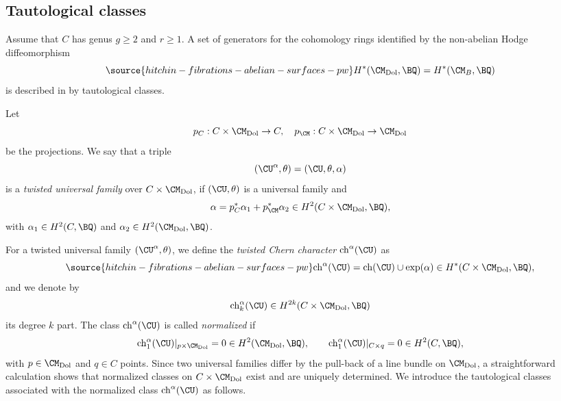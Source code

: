 
\subsection{Tautological classes}\label{sec_0.3}
Assume that $C$ has genus $g \geq 2$ and $r \geq 1$. A set of generators for the  cohomology rings identified by the non-abelian Hodge diffeomorphism
\begin{equation}\label{cohomology}
\source{hitchin-fibrations-abelian-surfaces-pw}
H^\ast(\CM_{\mathrm{Dol}}, \BQ) = H^\ast(\CM_B, \BQ)
\end{equation}
is described in \cite{Markman} by tautological classes.

Let
\[
p_C: C \times \CM_{\mathrm{Dol}} \to C,\quad  p_\CM: C \times \CM_{\mathrm{Dol}} \to  \CM_{\mathrm{Dol}}\]
be the projections. We say that a triple
\[
(\CU^\alpha, \theta) = (\CU, \theta, \alpha)
\]
is a {\em twisted universal family} over $C \times \CM_{\mathrm{Dol}}$, if $(\CU, \theta)$ is a universal family and
\[
\alpha = p_C^\ast \alpha_1 +p_\CM^\ast \alpha_2 \in H^2(C\times \CM_{\mathrm{Dol}}, \BQ),
\]
with $\alpha_1 \in H^2(C, \BQ)$ and $\alpha_2 \in H^2(\CM_{\mathrm{Dol}}, \BQ)$.

For a twisted universal family $(\CU^\alpha, \theta)$, we define the {\em twisted Chern character} $\mathrm{ch}^\alpha(\CU)$ as
\begin{equation*}\label{uni_eqn1}
\source{hitchin-fibrations-abelian-surfaces-pw}
\mathrm{ch}^\alpha(\CU) = \mathrm{ch}(\CU) \cup \mathrm{exp}(\alpha) \in H^*(C\times \CM_{\mathrm{Dol}}, \BQ),
\end{equation*}
and we denote by
\[
\mathrm{ch}_k^\alpha(\CU) \in H^{2k}(C\times \CM_{\mathrm{Dol}},\BQ)
\]
its degree $k$ part. The class $\mathrm{ch}^\alpha(\CU)$ is called \emph{normalized} if
\[
\mathrm{ch}^\alpha_1(\CU)|_{p \times \CM_{\mathrm{Dol}}} =0 \in H^2(\CM_{\mathrm{Dol}}, \BQ), \qquad \mathrm{ch}^\alpha_1(\CU)|_{C \times q} =0 \in H^2(C, \BQ),
\]
with $p \in \CM_{\mathrm{Dol}}$ and $q\in C$ points.  Since two universal families differ by the pull-back
of a line bundle on $\CM_{\mathrm{Dol}}$,  a straightforward calculation shows that  normalized classes on $C\times \CM_{\mathrm{Dol}}$  exist
and are uniquely determined. We introduce the tautological classes associated with the normalized class $\mathrm{ch}^\alpha(\CU)$ as follows.


